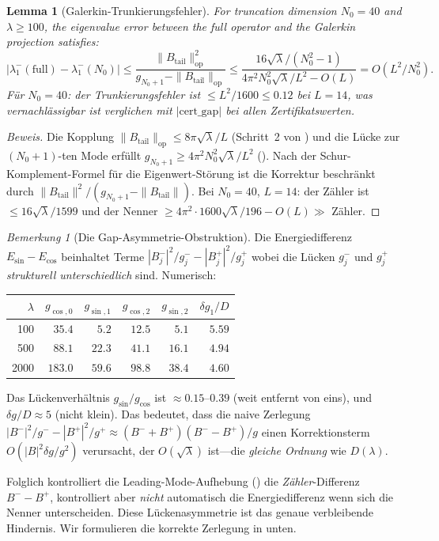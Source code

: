 \documentclass[12pt,a4paper]{article}
\newtheorem{lemma}[theorem]{Lemma}
\theoremstyle{definition}
\theoremstyle{remark}
\newtheorem{remark}[theorem]{Bemerkung}
\begin{document}
\begin{lemma}[Galerkin-Trunkierungsfehler]
\label{lem:galerkin-error}
For truncation dimension $N_0 = 40$ and $\lambda \geq 100$, the eigenvalue error between the full operator and the Galerkin projection satisfies:
\[
  |\lambda_1^-(\mathrm{full}) - \lambda_1^-(N_0)|
  \leq \frac{\|B_{\mathrm{tail}}\|_{\mathrm{op}}^2}{g_{N_0+1} - \|B_{\mathrm{tail}}\|_{\mathrm{op}}}
  \leq \frac{16\sqrt{\lambda}/(N_0^2-1)}{4\pi^2 N_0^2\sqrt{\lambda}/L^2 - O(L)}
  = O(L^2/N_0^2).
\]
Für $N_0 = 40$: der Trunkierungsfehler ist $\leq L^2/1600 \leq 0.12$ bei $L = 14$, was vernachlässigbar ist verglichen mit $|\mathrm{cert\_gap}|$ bei allen Zertifikatswerten.
\end{lemma}
\begin{proof}[Beweis]
Die Kopplung $\|B_{\mathrm{tail}}\|_{\mathrm{op}} \leq 8\pi\sqrt{\lambda}/L$ (Schritt~2 von ) und die Lücke zur $(N_0+1)$-ten Mode erfüllt $g_{N_0+1} \geq 4\pi^2 N_0^2\sqrt{\lambda}/L^2$ (). Nach der Schur-Komplement-Formel für die Eigenwert-Störung ist die Korrektur beschränkt durch $\|B_{\mathrm{tail}}\|^2/(g_{N_0+1} - \|B_{\mathrm{tail}}\|)$. Bei $N_0 = 40$, $L = 14$: der Zähler ist $\leq 16\sqrt{\lambda}/1599$ und der Nenner $\geq 4\pi^2 \cdot 1600\sqrt{\lambda}/196 - O(L) \gg $ Zähler.
\end{proof}

\begin{remark}[Die Gap-Asymmetrie-Obstruktion]
\label{rem:gap-asymmetry}
Die Energiedifferenz $E_{\sin} - E_{\cos}$ beinhaltet Terme $|B_j^-|^2/g_j^- - |B_j^+|^2/g_j^+$ wobei die Lücken $g_j^-$ und $g_j^+$ \emph{strukturell unterschiedlich} sind. Numerisch:

\begin{center}
\small
\renewcommand{\arraystretch}{1.15}
\begin{tabular}{r|rr|rr|r}
$\lambda$ & $g_{\cos,0}$ & $g_{\sin,1}$ & $g_{\cos,2}$ & $g_{\sin,2}$ & $\delta g_1/D$ \\\hline
100  & $35.4$ & $5.2$  & $12.5$ & $5.1$  & $5.59$ \\
500  & $88.1$ & $22.3$ & $41.1$ & $16.1$ & $4.94$ \\
2000 & $183.0$ & $59.6$ & $98.8$ & $38.4$ & $4.60$
\end{tabular}
\end{center}

\noindent Das Lückenverhältnis $g_{\sin}/g_{\cos}$ ist $\approx 0.15$--$0.39$ (weit entfernt von eins), und $\delta g/D \approx 5$ (nicht klein). Das bedeutet, dass die naive Zerlegung $|B^-|^2/g^- - |B^+|^2/g^+ \approx (B^- + B^+)(B^- - B^+)/g$ einen Korrektionsterm $O(|B|^2 \delta g / g^2)$ verursacht, der $O(\sqrt{\lambda})$ ist---die \emph{gleiche Ordnung} wie $D(\lambda)$.

Folglich kontrolliert die Leading-Mode-Aufhebung () die \emph{Zähler}-Differenz $B^- - B^+$, kontrolliert aber \emph{nicht} automatisch die Energiedifferenz wenn sich die Nenner unterscheiden. Diese Lückenasymmetrie ist das genaue verbleibende Hindernis. Wir formulieren die korrekte Zerlegung in  unten.
\end{remark}
\end{document}
